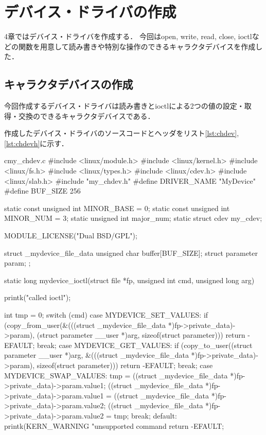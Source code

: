 \chapter{デバイス・ドライバの作成}
4章ではデバイス・ドライバを作成する．
今回はopen, write, read, close, ioctlなどの関数を用意して読み書きや特別な操作のできるキャラクタデバイスを作成した．

\section{キャラクタデバイスの作成}
今回作成するデバイス・ドライバは読み書きとioctlによる2つの値の設定・取得・交換のできるキャラクタデバイスである．

作成したデバイス・ドライバのソースコードとヘッダをリスト\ref{lst:chdev},\ref{lst:chdevh}に示す．
\begin{longlisting}
\begin{myminted}{c}{my\_chdev.c}
#include <linux/module.h>
#include <linux/kernel.h>
#include <linux/fs.h>
#include <linux/types.h>
#include <linux/cdev.h>
#include <linux/slab.h>
#include "my_chdev.h"
#define DRIVER_NAME "MyDevice"
#define BUF_SIZE 256

static const unsigned int MINOR_BASE = 0;
static const unsigned int MINOR_NUM  = 3;
static unsigned int major_num;
static struct cdev my_cdev;

MODULE_LICENSE("Dual BSD/GPL");

struct _mydevice_file_data {
    unsigned char buffer[BUF_SIZE];
    struct parameter param;
};

static long mydevice_ioctl(struct file *fp, unsigned int cmd, unsigned long arg) {
    printk("called ioctl\n");

    int tmp = 0;
    switch (cmd) {
        case MYDEVICE_SET_VALUES:
            if (copy_from_user(&(((struct _mydevice_file_data *)fp->private_data)->param), (struct parameter __user *)arg, sizeof(struct parameter))) {
                return -EFAULT;
            }
            break;
        case MYDEVICE_GET_VALUES:
            if (copy_to_user((struct parameter __user *)arg, &(((struct _mydevice_file_data *)fp->private_data)->param), sizeof(struct parameter))) {
                return -EFAULT;
            }
            break;
        case MYDEVICE_SWAP_VALUES:
            tmp = ((struct _mydevice_file_data *)fp->private_data)->param.value1;
            ((struct _mydevice_file_data *)fp->private_data)->param.value1 = ((struct _mydevice_file_data *)fp->private_data)->param.value2;
            ((struct _mydevice_file_data *)fp->private_data)->param.value2 = tmp;
            break;
        default:
            printk(KERN_WARNING "unsupported command %
            return -EFAULT;
    }

}
\end{myminted}
\end{longlisting}
